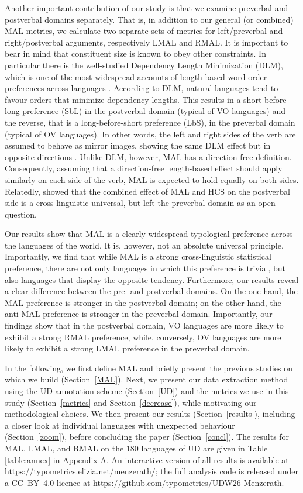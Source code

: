 Another important contribution of our study is that we examine preverbal and postverbal domains separately. That is, in addition to our general (or combined) MAL metrics, we calculate two separate sets of metrics for left/preverbal and right/postverbal arguments, respectively LMAL and RMAL. It is important to bear in mind that constituent size is known to obey other constraints. In particular there is the well-studied Dependency Length Minimization (DLM), which is one of the most widespread accounts of length-based word order preferences across languages \citep{Futrelletal2015,Ramon2004}. According to DLM, natural languages tend to favour orders that minimize dependency lengths. This results in a short-before-long preference (SbL) in the postverbal domain (typical of VO languages) and the reverse, that is a long-before-short preference (LbS), in the preverbal domain (typical of OV languages). In other words, the left and right sides of the verb are assumed to behave as mirror images, showing the same DLM effect but in opposite directions \citep{Hawkins2007}. Unlike DLM, however, MAL has a direction-free definition. Consequently, assuming that a direction-free length-based effect should apply similarly on each side of the verb, MAL is expected to hold equally on both sides. Relatedly, \citet{chen2022co} showed that the combined effect of MAL and HCS on the postverbal side is a cross-linguistic universal, but left the preverbal domain as an open question.

Our results show that MAL is a clearly widespread typological preference across the languages of the world. It is, however, not an absolute universal principle. Importantly, we find that while MAL is a strong cross-linguistic statistical preference, there are not only languages in which this preference is trivial, but also languages that display the opposite tendency. Furthermore, our results reveal a clear difference between the pre- and postverbal domains. On the one hand, the MAL preference is stronger in the postverbal domain; on the other hand, the anti-MAL preference is stronger in the preverbal domain. Importantly, our findings show that in the postverbal domain, VO languages are more likely to exhibit a strong RMAL preference, while, conversely, OV languages are more likely to exhibit a strong LMAL preference in the preverbal domain.

In the following, we first define MAL and briefly present the previous studies on which we build (Section~\ref{MAL}). Next, we present our data extraction method using the UD annotation scheme (Section~\ref{UD}) and the metrics we use in this study (Section~\ref{metrics} and Section~\ref{decrease}), while motivating our methodological choices. We then present our results (Section~\ref{results}), including a closer look at individual languages with unexpected behaviour (Section~\ref{zoom}), before concluding the paper (Section~\ref{concl}). The results for MAL, LMAL, and RMAL on the 180 languages of UD are given in Table \ref{table:annex} in Appendix A. An interactive version of all results is available at \url{https://typometrics.elizia.net/menzerath/}; the full analysis code is released under a CC~BY~4.0 licence at \url{https://github.com/typometrics/UDW26-Menzerath}.
